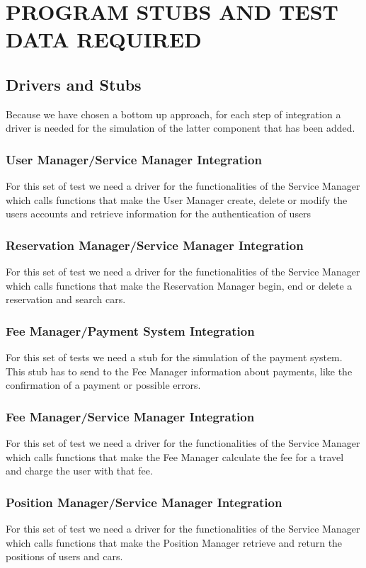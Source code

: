 \section{PROGRAM STUBS AND TEST DATA REQUIRED}
\subsection{Drivers and Stubs}
Because we have chosen a bottom up approach, for each step of integration a driver is needed for the simulation of the latter component that has been added.
\subsubsection{User Manager/Service Manager Integration}
For this set of test we need a driver for the functionalities of the Service Manager which calls functions that make the User Manager create, delete or modify the users accounts and retrieve information for the authentication of users
\subsubsection{Reservation Manager/Service Manager Integration}
For this set of test we need a driver for the functionalities of the Service Manager which calls functions that make the Reservation Manager begin, end or delete a reservation and search cars.
\subsubsection{Fee Manager/Payment System Integration}
For this set of tests we need a stub for the simulation of the payment system. This stub has to send to the Fee Manager information about payments, like the confirmation of a payment or possible errors.
\subsubsection{Fee Manager/Service Manager Integration}
For this set of test we need a driver for the functionalities of the Service Manager which calls functions that make the Fee Manager calculate the fee for a travel and charge the user with that fee.
\subsubsection{Position Manager/Service Manager Integration}
For this set of test we need a driver for the functionalities of the Service Manager which calls functions that make the Position Manager retrieve and return the positions of users and cars.
